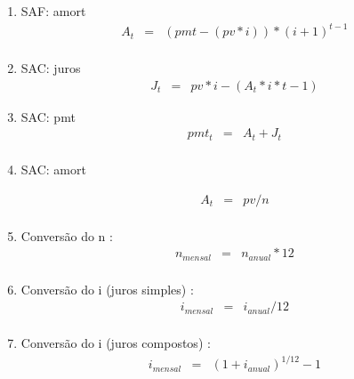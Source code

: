 \begin{enumerate}

\item  SAF: amort \cite{adail}
\begin{eqnarray*}
 	A_{t} &=& (pmt - (pv*i)) * (i+1)^{t-1} \\	
\end{eqnarray*}
 

\item  SAC: juros \cite{adail}
\begin{eqnarray*}
 	J_{t} &=& pv*i - (A_{t}*i*t-1)	
\end{eqnarray*}
 

\item  SAC: pmt \cite{adail}
\begin{eqnarray*}
 	pmt_{t} &=& A_{t} + J_{t}	\\
\end{eqnarray*}
 

\item  SAC: amort \cite{adail}

\begin{eqnarray*}
 	A_{t} &=& pv / n \\	
\end{eqnarray*}
 

\item  Conversão do n \cite{man2}:
\begin{eqnarray*}
 	n_{mensal} &=& n_{anual} * 12 \\	
\end{eqnarray*}
 

\item  Conversão do i (juros simples) \cite{camilo}:
\begin{eqnarray*}
 	i_{mensal} &=& i_{anual} / 12 \\	
\end{eqnarray*}
  

\item  Conversão do i (juros compostos) \cite{camilo}:
\begin{eqnarray*}
 	i_{mensal} &=& (1+i_{anual})^{1/12} - 1 \\	
\end{eqnarray*}
 

\end{enumerate}
